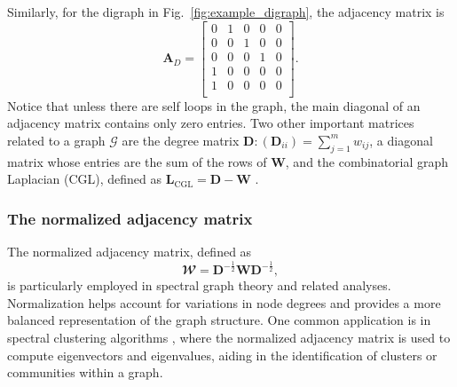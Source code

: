 Similarly, for the digraph in Fig.~\ref{fig:example_digraph}, the adjacency matrix is
\begin{equation*}
	\bm{A}_D = \begin{bmatrix}
		0 & 1 & 0 & 0 & 0\\
		0 & 0 & 1 & 0 & 0\\
		0 & 0 & 0 & 1 & 0\\
		1 & 0 & 0 & 0 & 0\\
		1 & 0 & 0 & 0 & 0\\
	\end{bmatrix}.
\end{equation*} 
Notice that unless there are self loops in the graph, the main diagonal of an adjacency matrix contains only zero entries. Two other important matrices related to a graph $ \mathcal{G} $ are the degree matrix $ \bm{D}: (\bm{D}_{ii})=\sum_{j=1}^{m} w_{ij} $, a diagonal matrix whose entries are the sum of the rows of $ \bm{W} $, and the combinatorial graph Laplacian (CGL), defined as $ \bm{L}_\text{CGL} = \bm{D} - \bm{W} $ \cite{Mateos2019ConnectingdotsIdentifying}.

\subsubsection{The normalized adjacency matrix} 
The normalized adjacency matrix, defined as
\begin{equation}
	\mathbfcal{W} = \bm{D}^{-\frac{1}{2}} \bm{W} \bm{D}^{-\frac{1}{2}},
\end{equation}
is particularly employed in spectral graph theory \cite{Spielman2012Spectralgraphtheory} and related analyses. Normalization helps account for variations in node degrees and provides a more balanced representation of the graph structure. One common application is in spectral clustering algorithms \cite{VonLuxburg2007tutorialspectralclusteringa}, where the normalized adjacency matrix is used to compute eigenvectors and eigenvalues, aiding in the identification of clusters or communities within a graph. %

